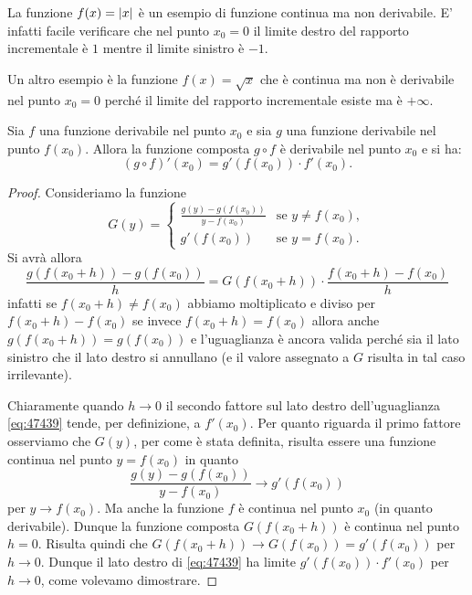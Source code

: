 \begin{example}
\mymark{***}
La funzione $f(x) = {\left|x\right|}$ è un esempio di funzione continua ma non
derivabile. E' infatti facile verificare che nel punto $x_0=0$ il
limite destro del rapporto incrementale è $1$ mentre il limite
sinistro è $-1$.

Un altro esempio è la funzione $f(x) = \sqrt{x}$ che è continua ma non
è derivabile nel punto $x_0=0$ perché il limite del rapporto incrementale esiste ma è $+\infty$.
\end{example}



\begin{theorem}
\mymark{**}
Sia $f$ una funzione derivabile nel punto $x_0$
e sia $g$ una funzione derivabile nel punto $f(x_0)$.
Allora la funzione composta $g\circ f$ è derivabile
nel punto $x_0$ e si ha:
\[
  (g\circ f)'(x_0) = g'(f(x_0))\cdot f'(x_0).
\]
\end{theorem}
%
\begin{proof}
\mymark{**}
Consideriamo la funzione
\[
  G(y) =
  \begin{cases}
   \frac{g(y) - g(f(x_0))}{y-f(x_0)} & \text{se $y \neq f(x_0)$},\\
   g'(f(x_0)) & \text{se $y=f(x_0)$}.
  \end{cases}
\]
Si avrà allora
\begin{equation}\label{eq:47439}
 \frac{g(f(x_0+h))-g(f(x_0))}{h}
 = G(f(x_0+h)) \cdot \frac{f(x_0+h)-f(x_0)}{h}
\end{equation}
infatti se $f(x_0+h)\neq f(x_0)$ abbiamo moltiplicato e diviso
per $f(x_0+h) - f(x_0)$ se invece $f(x_0+h)=f(x_0)$ allora anche $g(f(x_0+h))=g(f(x_0))$ e l'uguaglianza è ancora valida perché sia il lato sinistro che il lato destro si annullano (e il valore assegnato a $G$ risulta in tal caso irrilevante).

Chiaramente quando $h\to 0$ il secondo fattore sul lato destro
dell'uguaglianza \eqref{eq:47439}
tende, per definizione, a $f'(x_0)$.
Per quanto riguarda il primo fattore
osserviamo che $G(y)$, per come è stata definita, risulta essere una funzione continua nel punto $y=f(x_0)$ in quanto
\[
\frac{g(y) - g(f(x_0))}{y-f(x_0)} \to g'(f(x_0))
\]
per $y\to f(x_0)$.
Ma anche la funzione $f$ è continua nel punto $x_0$ (in quanto derivabile).
Dunque la funzione composta $G(f(x_0+h))$ è continua nel punto $h=0$.
Risulta quindi che $G(f(x_0+h)) \to G(f(x_0)) = g'(f(x_0))$ per $h\to 0$.
Dunque il lato destro di \eqref{eq:47439} ha limite $g'(f(x_0)) \cdot f'(x_0)$ per $h\to 0$, come volevamo dimostrare.
\end{proof}

